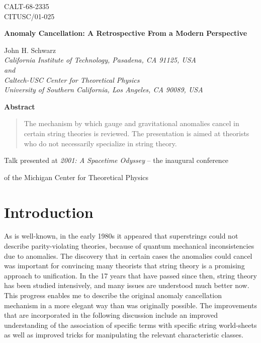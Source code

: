 \documentclass[a4paper,12pt]{article}
\begin{document}
\baselineskip 20pt
\vspace*{-.6in}
\thispagestyle{empty}
\begin{flushright}
CALT-68-2335\\ CITUSC/01-025
\end{flushright}

\vspace{.5in} {\Large
\begin{center}
{\bf Anomaly Cancellation: A Retrospective From a Modern Perspective}\end{center}}
\bigskip
\begin{center}
 John H. Schwarz\\
\bigskip
\emph{California Institute of Technology, Pasadena, CA  91125, USA\\
and\\
Caltech-USC Center for Theoretical Physics\\
University of Southern California, Los Angeles, CA 90089, USA}
\end{center}
\vspace{0.8in}

\begin{center}
\textbf{Abstract}
\end{center}
\begin{quotation}
\noindent The mechanism by which gauge and gravitational
anomalies cancel in certain string theories is reviewed.  The
presentation is aimed at theorists who do not necessarily
specialize in string theory.
\end{quotation}

\vspace{0.8in}

\centerline{Talk presented at {\it 2001: A Spacetime Odyssey} -- the inaugural conference}
\centerline{of the Michigan Center for Theoretical Physics}

\newpage

\section{Introduction}

As is well-known, in the early 1980s it appeared that superstrings
could not describe parity-violating theories, because of quantum
mechanical inconsistencies due to anomalies. The discovery that in
certain cases the anomalies could cancel\cite{Green:1984sg} was
important for convincing many theorists that string theory is a
promising approach to unification. In the 17 years that have
passed since then, string theory has been studied intensively, and
many issues are understood much better now. This progress enables
me to describe the original anomaly cancellation mechanism in a
more elegant way than was originally possible. The
improvements that are incorporated in the following discussion
include an improved understanding of the association of specific
terms with specific string world-sheets as well as improved tricks
for manipulating the relevant characteristic classes.
\end{document}
